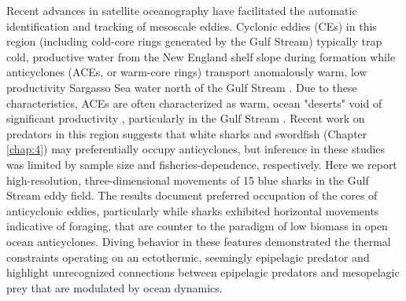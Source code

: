 Recent advances in satellite oceanography have facilitated the automatic identification and tracking of mesoscale eddies. Cyclonic eddies (CEs) in this region (including cold-core rings generated by the Gulf Stream) typically trap cold, productive water from the New England shelf slope during formation \citep{Pingree1979, RingGroup1981} while anticyclones (ACEs, or warm-core rings) transport anomalously warm, low productivity Sargasso Sea water north of the Gulf Stream \citep{Joyce1985, Franks1986}. Due to these characteristics, ACEs are often characterized as warm, ocean "deserts" void of significant productivity \citep{Williams1998}, particularly in the Gulf Stream \citep{Gaube2014} \citep[except see][]{Franks1986,Nelson1989}. Recent work on predators in this region suggests that white sharks \citep{Gaube2018} and swordfish (Chapter \ref{chap:4}) may preferentially occupy anticyclones, but inference in these studies was limited by sample size and fisheries-dependence, respectively. Here we report high-resolution, three-dimensional movements of 15 blue sharks in the Gulf Stream eddy field. The results document preferred occupation of the cores of anticyclonic eddies, particularly while sharks exhibited horizontal movements indicative of foraging, that are counter to the paradigm of low biomass in open ocean anticyclones. Diving behavior in these features demonstrated the thermal constraints operating on an ectothermic, seemingly epipelagic predator and highlight unrecognized connections between epipelagic predators and mesopelagic prey that are modulated by ocean dynamics.

